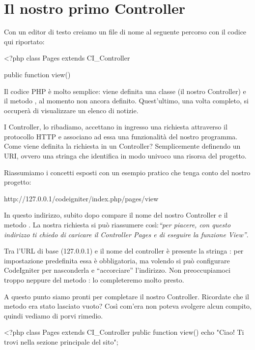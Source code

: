 \section*{Il nostro primo Controller}
Con un editor di testo creiamo un file di nome  al seguente percorso  con il codice qui riportato:

\begin{code}
<?php
class Pages extends CI_Controller {
	public function view()
	{

	}
}
\end{code}

Il codice \ac{PHP} è molto semplice: viene definita una classe  (il nostro Controller) e il metodo , al momento non ancora definito. Quest'ultimo, una volta completo, si occuperà di visualizzare un elenco di notizie.

I Controller, lo ribadiamo, accettano in ingresso una richiesta attraverso il protocollo \ac{HTTP} e associano ad essa una funzionalità del nostro programma. Come viene definita la richiesta in un Controller? Semplicemente definendo un \ac{URI}, ovvero una stringa che identifica in modo univoco una risorsa del progetto. 

Riassumiamo i concetti esposti con un esempio pratico che tenga conto del nostro progetto:

\begin{code}
http://127.0.0.1/codeigniter/index.php/pages/view
\end{code}

In questo indirizzo, subito dopo  compare il nome del nostro Controller  e il metodo . La nostra richiesta si può riassumere così:\textit{``per piacere, con questo indirizzo ti chiedo di caricare il Controller Pages e di eseguire la funzione View''}. 

Tra l'\ac{URL} di base (127.0.0.1) e il nome del controller  è presente la stringa : per impostazione predefinita essa è obbligatoria, ma volendo si può configurare CodeIgniter per nasconderla e ``accorciare'' l'indirizzo. Non preoccupiamoci troppo neppure del metodo : lo completeremo molto presto.

A questo punto siamo pronti per completare il nostro Controller. Ricordate che il metodo  era stato lasciato vuoto? Così com'era non poteva svolgere alcun compito, quindi vediamo di porvi rimedio.

\begin{code}
<?php
class Pages extends CI_Controller {
	public function view()
	{
		echo "Ciao! Ti trovi nella sezione principale del sito";
	}
}
\end{code}

